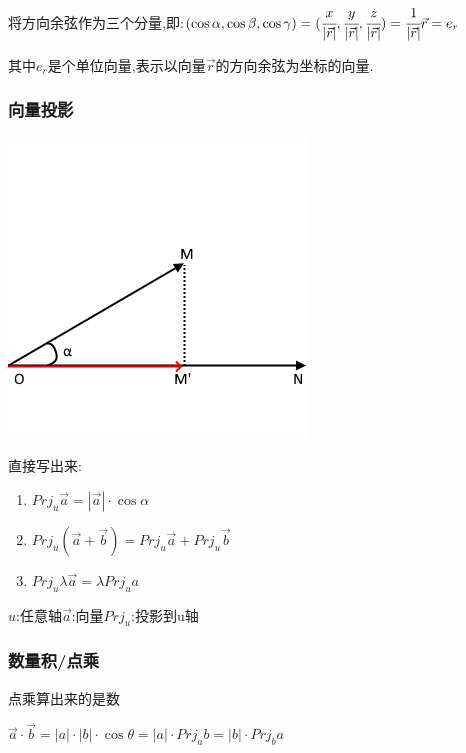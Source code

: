\documentclass[UTF8,12pt]{ctexbook}
\newcommand{\projection}[1]{Prj_{#1}}
\begin{document}
{{{{      将方向余弦作为三个分量,即:$(\cos\alpha,\cos\beta,\cos\gamma) = (\cfrac{x}{|\vec{r}|}, \cfrac{y}{|\vec{r}|}, \cfrac{z}{|\vec{r}|}) = \cfrac{1}{|\vec{r}|}\vec{r} = e_r$

      其中$e_r$是个单位向量,表示以向量$\vec{r}$的方向余弦为坐标的向量.

    }%

    \subsubsection{向量投影}{
      \begin{center}
        \includegraphics{resources/vector_axis_projection.png}
      \end{center}

      直接写出来:
      \begin{enumerate}
        \item $\projection{u}\vec{a} = |\vec{a}|\cdot\cos\alpha$
        \item $\projection{u}(\vec{a} + \vec{b}) = \projection{u}\vec{a} + \projection{u}\vec{b}$
        \item $\projection{u}\lambda\vec{a} = \lambda\projection{u}a$
      \end{enumerate}

      $u$:任意轴\qquad$\vec{a}$:向量\qquad$\projection{u}$:投影到u轴

    }%

    \subsubsection{数量积/点乘}{
      点乘算出来的是数

      $\vec{a} \cdot \vec{b} = |a|\cdot|b|\cdot\cos\theta = |a|\cdot\projection{a}b = |b|\cdot\projection{b}a$

}}}}
\end{document}
